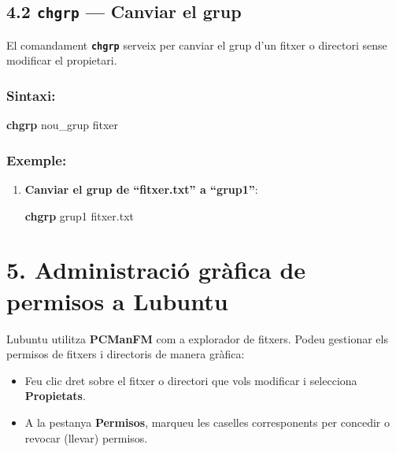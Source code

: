 \documentclass[
  a4paper,
]{article}
\newenvironment{Shaded}{\begin{snugshade}}{\end{snugshade}}
\newcommand{\FunctionTok}[1]{\textcolor[rgb]{0.13,0.29,0.53}{\textbf{#1}}}
\newcommand{\NormalTok}[1]{#1}
\begin{document}
\subsection{\texorpdfstring{4.2 \texttt{chgrp} --- Canviar el
grup}{4.2 chgrp --- Canviar el grup}}\label{chgrp-canviar-el-grup}

El comandament \textbf{\texttt{chgrp}} serveix per canviar el grup d'un
fitxer o directori sense modificar el propietari.

\subsubsection{Sintaxi:}\label{sintaxi-3}

\begin{Shaded}
\begin{Highlighting}[]
\FunctionTok{chgrp}\NormalTok{ nou\_grup fitxer}
\end{Highlighting}
\end{Shaded}

\subsubsection{Exemple:}\label{exemple}

\begin{enumerate}
\def\labelenumi{\arabic{enumi}.}
\item
  \textbf{Canviar el grup de ``fitxer.txt'' a ``grup1''}:

\begin{Shaded}
\begin{Highlighting}[]
\FunctionTok{chgrp}\NormalTok{ grup1 fitxer.txt}
\end{Highlighting}
\end{Shaded}
\end{enumerate}

\section{5. Administració gràfica de permisos a
Lubuntu}\label{administraciuxf3-gruxe0fica-de-permisos-a-lubuntu}

Lubuntu utilitza \textbf{PCManFM} com a explorador de fitxers. Podeu
gestionar els permisos de fitxers i directoris de manera gràfica:

\begin{itemize}
\item
  Feu clic dret sobre el fitxer o directori que vols modificar i
  selecciona \textbf{Propietats}.
\item
  A la pestanya \textbf{Permisos}, marqueu les caselles corresponents
  per concedir o revocar (llevar) permisos.
\end{itemize}
\end{document}
